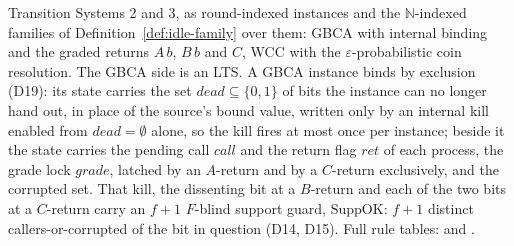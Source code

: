 \begin{definition}
  \label{def:aba-subspecs}
  \leanok
  Transition Systems 2 and 3, as round-indexed instances and the $\mathbb{N}$-indexed families of Definition~\ref{def:idle-family} over them: GBCA with internal binding and the graded returns $A\,b$, $B\,b$ and $C$, WCC with the $\varepsilon$-probabilistic coin resolution.
  The GBCA side is an LTS.\leanok{}
  A GBCA instance binds by exclusion (D19): its state carries the set $dead \subseteq \{0,1\}$ of bits the instance can no longer hand out, in place of the source's bound value, written only by an internal kill enabled from $dead = \emptyset$ alone, so the kill fires at most once per instance; beside it the state carries the pending call $call$ and the return flag $ret$ of each process, the grade lock $grade$, latched by an $A$-return and by a $C$-return exclusively, and the corrupted set.
  That kill, the dissenting bit at a $B$-return and each of the two bits at a $C$-return carry an $f{+}1$ $F$-blind support guard, $\mathrm{SuppOK}$: $f{+}1$ distinct callers-or-corrupted of the bit in question (D14, D15).
  Full rule tables:  and .
\end{definition}
